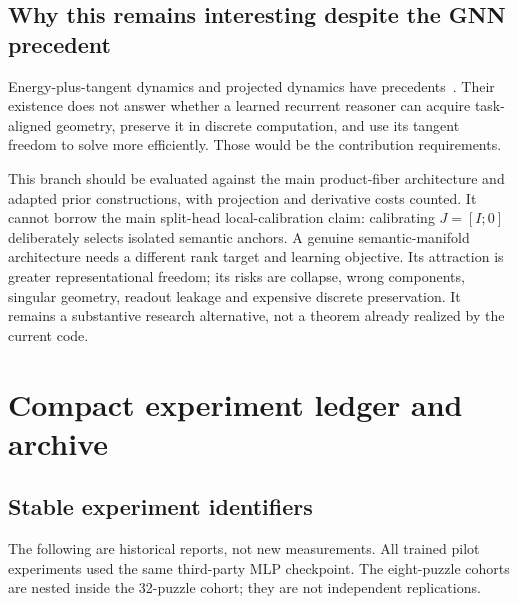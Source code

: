 \documentclass[11pt,a4paper]{article}
\newcommand{\newtopic}{\clearpage}
\begin{document}
\subsection{Why this remains interesting despite the GNN precedent}
Energy-plus-tangent dynamics and projected dynamics have precedents~\cite{tango,pnde}. Their existence does not answer whether a learned recurrent reasoner can acquire task-aligned geometry, preserve it in discrete computation, and use its tangent freedom to solve more efficiently. Those would be the contribution requirements.

This branch should be evaluated against the main product-fiber architecture and adapted prior constructions, with projection and derivative costs counted. It cannot borrow the main split-head local-calibration claim: calibrating $J=[I;0]$ deliberately selects isolated semantic anchors. A genuine semantic-manifold architecture needs a different rank target and learning objective. Its attraction is greater representational freedom; its risks are collapse, wrong components, singular geometry, readout leakage and expensive discrete preservation. It remains a substantive research alternative, not a theorem already realized by the current code.

\newtopic
\section{Compact experiment ledger and archive}\label{app:history}
\subsection{Stable experiment identifiers}
The following are historical reports, not new measurements. All trained pilot experiments used the same third-party MLP checkpoint. The eight-puzzle cohorts are nested inside the 32-puzzle cohort; they are not independent replications.
\end{document}
